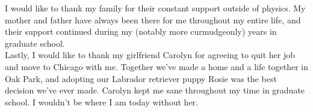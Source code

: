 I would like to thank my family for their constant support outside of physics. My mother and father have always been there for me throughout my entire life, and their support continued during my (notably more curmudgeonly) years in graduate school.\\

Lastly, I would like to thank my girlfriend Carolyn for agreeing to quit her job and move to Chicago with me. Together we've made a home and a life together in Oak Park, and adopting our Labrador retriever puppy Rosie was the best decision we've ever made. Carolyn kept me sane throughout my time in graduate school. I wouldn't be where I am today without her.